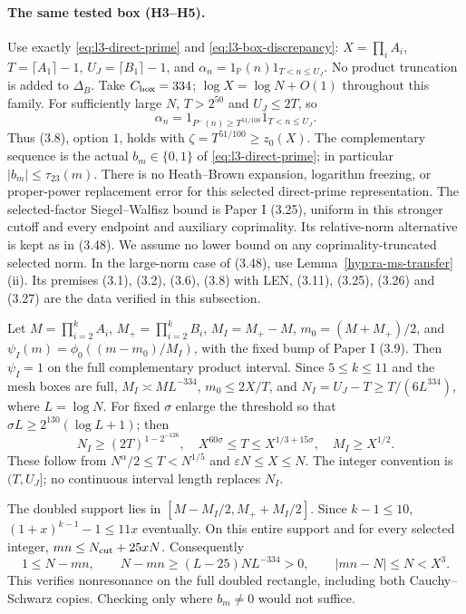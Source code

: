 \paragraph{The same tested box (H3--H5).}
Use exactly \eqref{eq:l3-direct-prime} and
\eqref{eq:l3-box-discrepancy}: $X=\prod_iA_i$, $T=\lceil A_1\rceil-1$,
$U_J=\lceil B_1\rceil-1$, and
$\alpha_n=1_{\mathbb P}(n)1_{T<n\le U_J}$.
No product truncation is added to $\Delta_B$. Take $C_{\rm box}=334$;
$\log X=\log N+O(1)$ throughout this family.
For sufficiently large $N$, $T>2^{50}$ and $U_J\le2T$, so
\[
 \alpha_n=1_{P^-(n)\ge T^{51/100}}1_{T<n\le U_J}.
\]
Thus (3.8), option $1$, holds with $\zeta=T^{51/100}\ge z_0(X)$.
The complementary sequence is the actual $b_m\in\{0,1\}$ of
\eqref{eq:l3-direct-prime}; in particular $|b_m|\le\tau_{23}(m)$.
There is no Heath--Brown expansion, logarithm freezing, or proper-power
replacement error for this selected direct-prime representation.
The selected-factor Siegel--Walfisz bound is Paper I (3.25), uniform
in this stronger cutoff and every endpoint and auxiliary coprimality.
Its relative-norm alternative is kept as in (3.48). We assume no lower
bound on any coprimality-truncated selected norm.
In the large-norm case of (3.48), use Lemma~\ref{hyp:ra-ms-transfer}(ii).
Its premises
(3.1), (3.2), (3.6), (3.8) with LEN, (3.11), (3.25), (3.26) and (3.27)
are the data verified in this subsection.

Let $M=\prod_{i=2}^kA_i$, $M_+=\prod_{i=2}^kB_i$,
$M_I=M_+-M$, $m_0=(M+M_+)/2$, and
$\psi_I(m)=\phi_0((m-m_0)/M_I)$, with the fixed bump of Paper I (3.9).
Then $\psi_I=1$ on the full complementary product interval. Since
$5\le k\le11$ and the mesh boxes are full,
$M_I\asymp ML^{-334}$, $m_0\le2X/T$, and
$N_I=U_J-T\ge T/(6L^{334})$, where $L=\log N$.
For fixed $\sigma$ enlarge the threshold so that
$\sigma L\ge2^{130}(\log L+1)$; then
\[
 N_I\ge(2T)^{1-2^{-126}},\quad
 X^{60\sigma}\le T\le X^{1/3+15\sigma},\quad M_I\ge X^{1/2}.
\]
These follow from $N^\alpha/2\le T<N^{1/5}$ and
$\varepsilon N\le X\le N$. The integer convention is
$(T,U_J]$; no continuous interval length replaces $N_I$.

The doubled support lies in
$[M-M_I/2,M_++M_I/2]$. Since $k-1\le10$,
$(1+x)^{k-1}-1\le11x$ eventually. On this entire support and for
every selected integer, $mn\le N_{\rm cut}+25xN$. Consequently
\[
 1\le N-mn,\qquad N-mn\ge(L-25)NL^{-334}>0,\qquad
 |mn-N|\le N<X^3.
\]
This verifies nonresonance on the full doubled rectangle, including
both Cauchy--Schwarz copies. Checking only where $b_m\ne0$
would not suffice.

